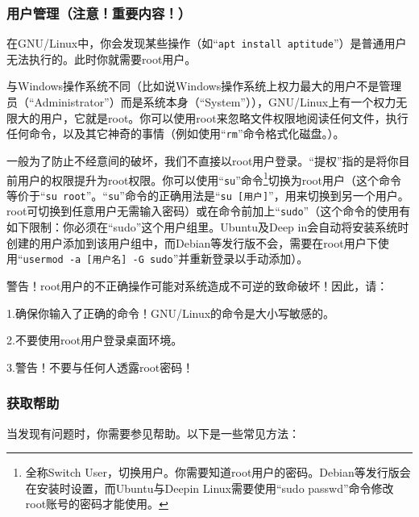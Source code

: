 \subsubsection{用户管理（注意！重要内容！）}
\cite{DebianRef}\par
在GNU/Linux中，你会发现某些操作（如“\verb|apt install aptitude|”）是普通用户无法执行的。此时你就需要root用户。\par
与Windows操作系统不同（比如说Windows操作系统上权力最大的用户不是管理员（“Administrator”）而是系统本身（“System”）），GNU/Linux上有一个权力无限大的用户，它就是root。你可以使用root来忽略文件权限地阅读任何文件，执行任何命令，以及其它神奇的事情（例如使用“\verb|rm|”命令格式化磁盘。）。\par
一般为了防止不经意间的破坏，我们不直接以root用户登录。“提权”指的是将你目前用户的权限提升为root权限。你可以使用“\verb|su|”命令\footnote{全称Switch User，切换用户。你需要知道root用户的密码。Debian等发行版会在安装时设置，而Ubuntu与Deepin Linux需要使用“sudo passwd”命令修改root账号的密码才能使用。}切换为root用户（这个命令等价于“\verb|su root|”。“\verb|su|”命令的正确用法是“\verb|su [用户]|”，用来切换到另一个用户。root可切换到任意用户无需输入密码）或在命令前加上“\verb|sudo|”（这个命令的使用有如下限制：你必须在“sudo”这个用户组里。Ubuntu及Deep in会自动将安装系统时创建的用户添加到该用户组中，而Debian等发行版不会，需要在root用户下使用“\verb|usermod -a [用户名] -G sudo|”并重新登录以手动添加）。\par
{\color{red}警告！root用户的不正确操作可能对系统造成不可逆的致命破坏！因此，请：\par
1.确保你输入了正确的命令！GNU/Linux的命令是大小写敏感的。\par
2.不要使用root用户登录桌面环境。\par
3.警告！不要与任何人透露root密码！}\par
\subsubsection{获取帮助}
\cite{manman}\par
当发现有问题时，你需要参见帮助。以下是一些常见方法：\par
